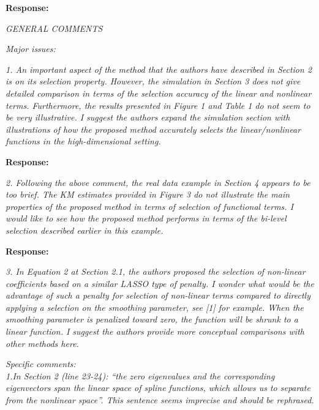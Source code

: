 \documentclass[11pt]{article}
\begin{document}
\medskip

\textbf{Response:} 

\bigskip

{\em GENERAL COMMENTS}

\medskip

{\em Major issues:}

\medskip

{\em 1. An important aspect of the method that the authors have described in Section 2 is on its selection property. However, the simulation in Section 3 does not give detailed comparison in terms of the selection accuracy of the linear and nonlinear terms. Furthermore, the results presented in Figure 1 and Table 1 do not seem to be very illustrative. I suggest the authors expand the simulation section with illustrations of how the proposed method accurately selects the linear/nonlinear functions in the high-dimensional setting.}

\medskip

\textbf{Response:} 


\bigskip

{\em 2. Following the above comment, the real data example in Section 4 appears to be too brief. The KM estimates provided in Figure 3 do not illustrate the main properties of the proposed method in terms of selection of functional terms. I would like to see how the proposed method performs in terms of the bi-level selection described earlier in this example.}

\medskip

\textbf{Response:} 

\medskip

{\em 3. In Equation 2 at Section 2.1, the authors proposed the selection of non-linear coefficients based on a similar LASSO type of penalty. I wonder what would be the advantage of such a penalty for selection of non-linear terms compared to directly applying a selection on the smoothing parameter, see [1] for example. When the smoothing parameter is penalized toward zero, the function will be shrunk to a linear function. I suggest the authors provide more conceptual comparisons with other methods here.}

\bigskip

{\em Specific comments:}\\

{\em 1.In Section 2 (line 23-24): “the zero eigenvalues and the corresponding eigenvectors span the linear space of spline functions, which allows us to separate from the nonlinear space”.
This sentence seems imprecise and should be rephrased.}
\end{document}
